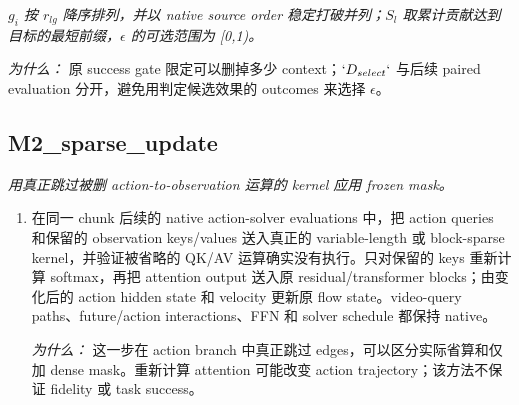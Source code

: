 \documentclass[10pt,a4paper]{article}
\begin{document}
\begin{enumerate}[leftmargin=*,start=3]
\noindent\emph{\(g_{i}\) 按 \(r_{lg}\) 降序排列，并以 native source order 稳定打破并列；\(S_{l}\) 取累计贡献达到目标的最短前缀，\(\epsilon \) 的可选范围为 [0,1)。}
\par{}
\par\emph{为什么：} 原 success gate 限定可以删掉多少 context；\(`D_{select}`\) 与后续 paired evaluation 分开，避免用判定候选效果的 outcomes 来选择 \(\epsilon \)。
\end{enumerate}
\subsection*{M2\_sparse\_update}
\emph{用真正跳过被删 action-to-observation 运算的 kernel 应用 frozen mask。}
\begin{enumerate}[leftmargin=*,start=5]
  \item 在同一 chunk 后续的 native action-solver evaluations 中，把 action queries 和保留的 observation keys/values 送入真正的 variable-length 或 block-sparse kernel，并验证被省略的 QK/AV 运算确实没有执行。只对保留的 keys 重新计算 softmax，再把 attention output 送入原 residual/transformer blocks；由变化后的 action hidden state 和 velocity 更新原 flow state。video-query paths、future/action interactions、FFN 和 solver schedule 都保持 native。
\par\emph{为什么：} 这一步在 action branch 中真正跳过 edges，可以区分实际省算和仅加 dense mask。重新计算 attention 可能改变 action trajectory；该方法不保证 fidelity 或 task success。
\end{enumerate}
\end{document}
